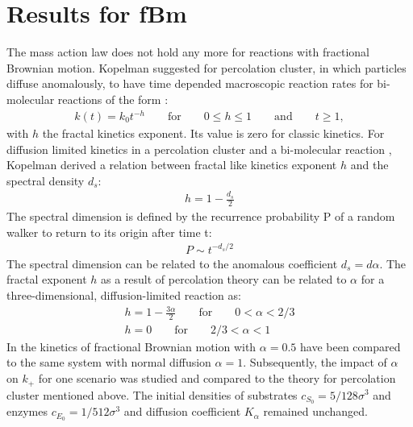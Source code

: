 \documentclass[
  a4paper,BCOR10mm,twoside,
  headsepline,footsepline,%
  fleqn,openbib
]{scrbook}
\begin{document}
\section{Results for fBm}
The mass action law does not hold any more for reactions with fractional Brownian motion. Kopelman suggested for percolation cluster, in which particles diffuse  anomalously, to have time depended macroscopic reaction rates for bi-molecular reactions of the form \cite{Kopelman1988}:
\begin{align} \label{ktime}
k(t)=k_0 t^{-h} \qquad \text{for} \qquad 0 \leq h \leq 1 \qquad \text{and} \qquad t \geq 1,
\end{align}
with $h$ the fractal kinetics exponent. Its value is zero for classic kinetics.  For  diffusion limited kinetics in a percolation cluster and a bi-molecular reaction , Kopelman derived a relation between fractal like kinetics exponent $h$ and the spectral density $d_s$:
\begin{align}
 h=1-\frac{d_s}{2}
\end{align}
The spectral dimension is defined by the recurrence probability $\mathrm{P}$ of a random walker to return to its origin after time t:
\begin{align}
 P\sim t^{-d_s/2}
\end{align}
The spectral dimension can be related to the anomalous coefficient $d_s=d \alpha$. 
The fractal exponent $h$ as a result of percolation theory can be related to $\alpha$ for a three-dimensional, diffusion-limited reaction  as:
\begin{align} \label{koppelmaneq}
 h=1-\frac{3 \alpha}{2} \qquad \text{for} \qquad 0<\alpha<2/3 \\
 h=0 \qquad \text{for} \qquad 2/3<\alpha<1
\end{align}
In the kinetics of fractional Brownian motion with $\alpha=0.5$ have been compared to the same system with normal diffusion $\alpha=1$. Subsequently, the impact of $\alpha$ on $k_{+}$ for one scenario was studied and compared to the theory for percolation cluster mentioned above. The initial densities of substrates $c_{S_0}=5/128\sigma^3$ and enzymes  $c_{E_0}=1/512 \sigma^3$ and diffusion coefficient $K_{\alpha}$ remained unchanged.
\end{document}
